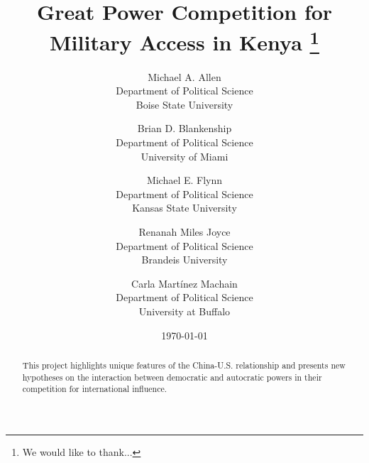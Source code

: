 \documentclass[12pt]{article}
\begin{document}
\author{Michael A. Allen \\ Department of Political Science \\ Boise State University \and Brian D. Blankenship \\Department of Political Science\\University of Miami \and Michael E. Flynn \\ Department of Political Science \\ Kansas State University \and Renanah Miles Joyce \\ Department of Political Science \\ Brandeis University \and Carla Mart\'{i}nez Machain \\ Department of Political Science \\ University at Buffalo}
\title{Great Power Competition for Military Access in Kenya \footnote{We would like to thank...}}

\date{\vspace{2em}\today \vspace{1em}}

\maketitle

\thispagestyle{empty}

\clearpage

\begin{abstract}
\noindent 

This project highlights unique features of the China-U.S. relationship and presents new hypotheses on the interaction between democratic and autocratic powers in their competition for international influence.
\end{abstract}




	\vfill
	
	\thispagestyle{empty}
	
	
	\newpage
\setcounter{page}{1}

\doublespacing
	
	
	
	
	

\newpage



\end{document}
